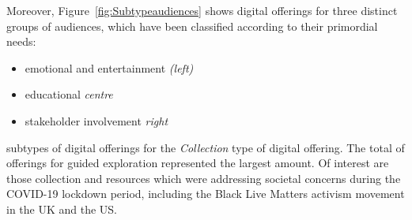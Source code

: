 \documentclass{egpubl}
\begin{document}
Moreover, Figure~\ref{fig:Subtypeaudiences} shows digital offerings for three distinct groups of audiences, which have been classified according to their primordial needs: 

\begin{itemize}
	\item emotional and entertainment  \emph{(left)}
	\item educational \emph{centre}
	\item stakeholder involvement \emph{right}
\end{itemize}

 subtypes of digital offerings for the \emph{Collection} type of digital offering. The total of offerings for guided exploration represented the largest amount. Of interest are those collection and resources which were addressing  societal concerns during the COVID-19 lockdown period, including the Black Live Matters activism movement in the UK and the US. 

\end{document}
